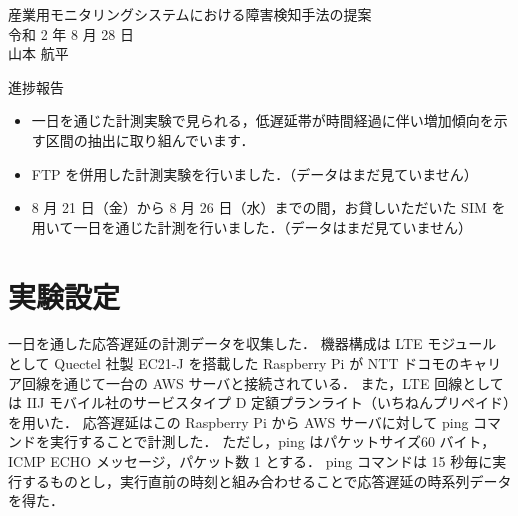 \documentclass[a4j]{jarticle}
\begin{document}
\begin{table}[t]
\begin{center}
{\large 産業用モニタリングシステムにおける障害検知手法の提案}\\
令和 2 年 8 月 28 日\\
山本 航平
\end{center}
\end{table}

進捗報告
\begin{itemize}
\item 一日を通じた計測実験で見られる，低遅延帯が時間経過に伴い増加傾向を示す区間の抽出に取り組んでいます．
\item FTP を併用した計測実験を行いました．（データはまだ見ていません）
\item 8 月 21 日（金）から 8 月 26 日（水）までの間，お貸しいただいた SIM を用いて一日を通じた計測を行いました．（データはまだ見ていません）
\end{itemize}

\section{実験設定}
一日を通した応答遅延の計測データを収集した．
機器構成は LTE モジュール として Quectel 社製 EC21-J を搭載した Raspberry Pi が NTT ドコモのキャリア回線を通じて一台の AWS サーバと接続されている．
また，LTE 回線としては IIJ モバイル社のサービスタイプ D 定額プランライト（いちねんプリペイド）を用いた．
応答遅延はこの Raspberry Pi から AWS サーバに対して ping コマンドを実行することで計測した．
ただし，ping はパケットサイズ60 バイト，ICMP ECHO メッセージ，パケット数 1 とする．
ping コマンドは 15 秒毎に実行するものとし，実行直前の時刻と組み合わせることで応答遅延の時系列データを得た．
\end{document}
